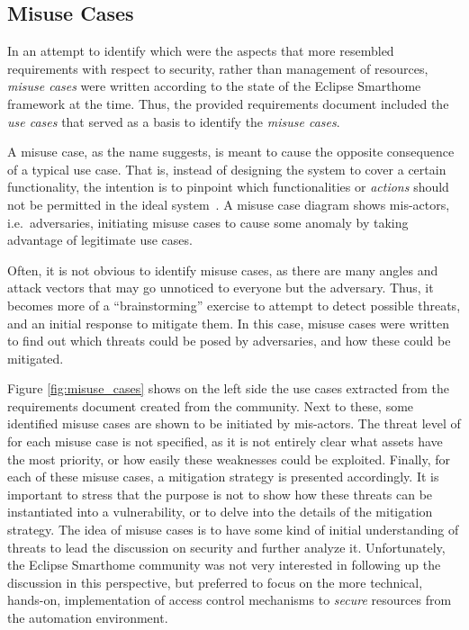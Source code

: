 \documentclass[12pt]{article}
\begin{document}
\subsection{Misuse Cases}

In an attempt to identify which were the aspects that more resembled requirements with respect to security, rather than management of resources, \emph{misuse cases} were written according to the state of the Eclipse Smarthome framework at the time. Thus, the provided requirements document included the \emph{use cases} that served as a basis to identify the \emph{misuse cases}. 

A misuse case, as the name suggests, is meant to cause the opposite consequence of a typical use case. That is, instead of designing the system to cover a certain functionality, the intention is to pinpoint which functionalities or \emph{actions} should not be permitted in the ideal system~\cite{misuse}. A misuse case diagram shows mis-actors, i.e.\ adversaries, initiating misuse cases to cause some anomaly by taking advantage of legitimate use cases.

Often, it is not obvious to identify misuse cases, as there are many angles and attack vectors that may go unnoticed to everyone but the adversary. Thus, it becomes more of a ``brainstorming'' exercise to attempt to detect possible threats, and an initial response to mitigate them. In this case, misuse cases were written to find out which threats could be posed by adversaries, and how these could be mitigated.

Figure \ref{fig:misuse_cases} shows on the left side the use cases extracted from the requirements document created from the community. Next to these, some identified misuse cases are shown to be initiated by mis-actors. The threat level of for each misuse case is not specified, as it is not entirely clear what assets have the most priority, or how easily these weaknesses could be exploited. Finally, for each of these misuse cases, a mitigation strategy is presented accordingly. It is important to stress that the purpose is not to show how these threats can be instantiated into a vulnerability, or to delve into the details of the mitigation strategy. The idea of misuse cases is to have some kind of initial understanding of threats to lead the discussion on security and further analyze it. Unfortunately, the Eclipse Smarthome community was not very interested in following up the discussion in this perspective, but preferred to focus on the more technical, hands-on, implementation of access control mechanisms to \emph{secure} resources from the automation environment.
\end{document}
